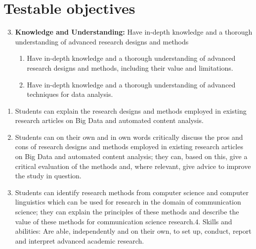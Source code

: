 \documentclass[a4paper,12pt]{report}
\begin{document}
\chapter{Testable objectives}

{\footnotesize{
	\begin{enumerate}
		\setcounter{enumi}{2}
		\item{\textbf{Knowledge and Understanding:} Have in-depth knowledge and a thorough understanding of advanced research designs and methods}
		\begin{enumerate}
			\item{Have in-depth knowledge and a thorough understanding of advanced research designs and methods, including their value and limitations.}
			\item{Have in-depth knowledge and a thorough understanding of advanced techniques for data analysis.}
		\end{enumerate}
	\end{enumerate}
}}

\begin{enumerate}[A]
\item Students can explain the research designs and methods employed in existing research articles on Big Data and automated content analysis.
\item Students can on their own and in own words critically discuss the pros and cons of research designs and methods employed in existing research articles on Big Data and automated content analysis; they can, based on this, give a critical evaluation of the methods and, where relevant, give advice to improve the study in question.
\item Students can identify research methods from computer science and computer linguistics which can be used for research in the domain of communication science; they can explain the principles of these methods and describe the value of these methods for communication science research.4. Skills and abilities: Are able, independently and on their own, to set up, conduct, report and interpret advanced academic research.
\end{enumerate}
\end{document}
